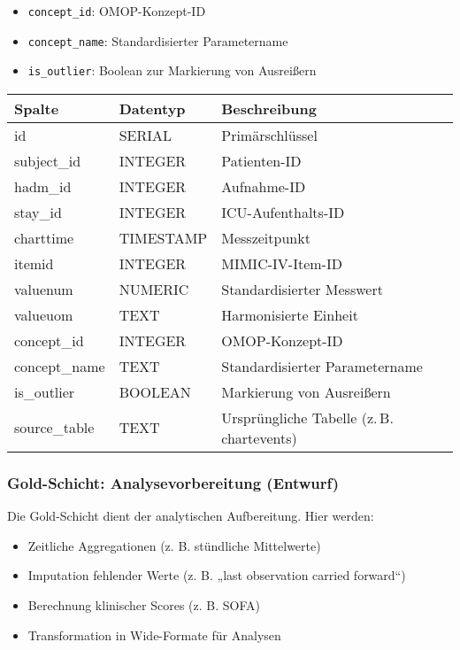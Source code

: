 \documentclass[12pt]{article}
\begin{document}
\begin{itemize}
    \item \texttt{concept\_id}: OMOP-Konzept-ID
    \item \texttt{concept\_name}: Standardisierter Parametername
    \item \texttt{is\_outlier}: Boolean zur Markierung von Ausreißern
\end{itemize}

\begin{center}
\begin{tabular}{|l|l|l|}
\hline
\textbf{Spalte} & \textbf{Datentyp} & \textbf{Beschreibung} \\
\hline
id & SERIAL & Primärschlüssel \\
subject\_id & INTEGER & Patienten-ID \\
hadm\_id & INTEGER & Aufnahme-ID \\
stay\_id & INTEGER & ICU-Aufenthalts-ID \\
charttime & TIMESTAMP & Messzeitpunkt \\
itemid & INTEGER & MIMIC-IV-Item-ID \\
valuenum & NUMERIC & Standardisierter Messwert \\
valueuom & TEXT & Harmonisierte Einheit \\
concept\_id & INTEGER & OMOP-Konzept-ID \\
concept\_name & TEXT & Standardisierter Parametername \\
is\_outlier & BOOLEAN & Markierung von Ausreißern \\
source\_table & TEXT & Ursprüngliche Tabelle (z. B. chartevents) \\
\hline
\end{tabular}
\end{center}

\subsubsection*{Gold-Schicht: Analysevorbereitung (Entwurf)}

Die Gold-Schicht dient der analytischen Aufbereitung. Hier werden:

\begin{itemize}
    \item Zeitliche Aggregationen (z. B. stündliche Mittelwerte)
    \item Imputation fehlender Werte (z. B. „last observation carried forward“)
    \item Berechnung klinischer Scores (z. B. SOFA)
    \item Transformation in Wide-Formate für Analysen
\end{itemize}
\end{document}
